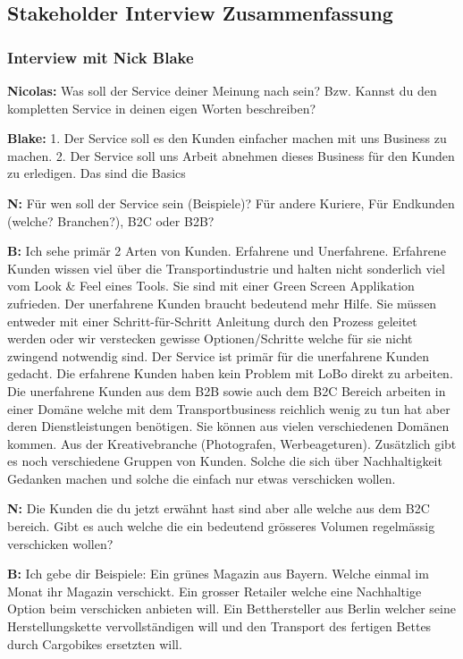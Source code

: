 \subsection{Stakeholder Interview Zusammenfassung}
\label{subsec:interviewzusammen}
\subsubsection{Interview mit Nick Blake}

\textbf{Nicolas:} Was soll der Service deiner Meinung nach sein? Bzw. Kannst du den kompletten Service in deinen eigen Worten beschreiben?

\textbf{Blake:} 1. Der Service soll es den Kunden einfacher machen mit uns Business zu machen. 2. Der Service soll uns Arbeit abnehmen dieses Business für den Kunden zu erledigen. Das sind die Basics

\textbf{N:} Für wen soll der Service sein (Beispiele)?
  Für andere Kuriere, Für Endkunden (welche? Branchen?), B2C oder B2B?

\textbf{B:} Ich sehe primär 2 Arten von Kunden. Erfahrene und Unerfahrene. Erfahrene Kunden wissen viel über die Transportindustrie und halten nicht sonderlich viel vom Look & Feel eines Tools. Sie sind mit einer Green Screen Applikation zufrieden. Der unerfahrene Kunden braucht bedeutend mehr Hilfe. Sie müssen entweder mit einer Schritt-für-Schritt Anleitung durch den Prozess geleitet werden oder wir verstecken gewisse Optionen/Schritte welche für sie nicht zwingend notwendig sind. Der Service ist primär für die unerfahrene Kunden gedacht. Die erfahrene Kunden haben kein Problem mit LoBo direkt zu arbeiten. Die unerfahrene Kunden aus dem B2B sowie auch dem B2C Bereich arbeiten in einer Domäne welche mit dem Transportbusiness reichlich wenig zu tun hat aber deren Dienstleistungen benötigen. Sie können aus vielen verschiedenen Domänen kommen. Aus der Kreativebranche (Photografen, Werbeageturen). Zusätzlich gibt es noch verschiedene Gruppen von Kunden. Solche die sich über Nachhaltigkeit Gedanken machen und solche die einfach nur etwas verschicken wollen.

\textbf{N:} Die Kunden die du jetzt erwähnt hast sind aber alle welche aus dem B2C bereich. Gibt es auch welche die ein bedeutend grösseres Volumen regelmässig verschicken wollen?

\textbf{B:} Ich gebe dir Beispiele:
Ein grünes Magazin aus Bayern. Welche einmal im Monat ihr Magazin verschickt. Ein grosser Retailer welche eine Nachhaltige Option beim verschicken anbieten will. Ein Betthersteller aus Berlin welcher seine Herstellungskette vervollständigen will und den Transport des fertigen Bettes durch Cargobikes ersetzten will.

